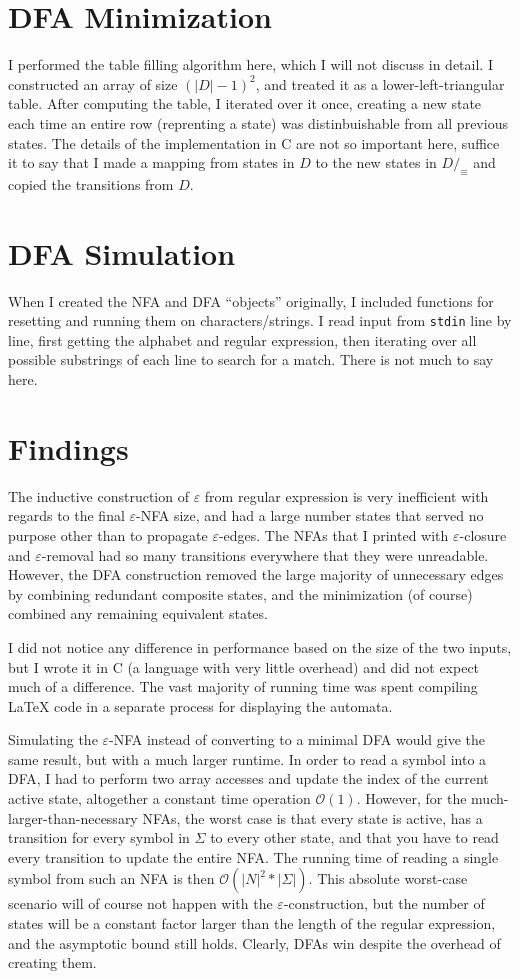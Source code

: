 \documentclass{article}
\begin{document}
\section*{DFA Minimization}
I performed the table filling algorithm here, which I will not discuss in detail. I constructed an array of size $(|D|-1)^2$, and treated it as a lower-left-triangular table. After computing the table, I iterated over it once, creating a new state each time an entire row (reprenting a state) was distinbuishable from all previous states. The details of the implementation in C are not so important here, suffice it to say that I made a mapping from states in $D$ to the new states in $D/_\equiv$ and copied the transitions from $D$.

\section*{DFA Simulation}
When I created the NFA and DFA ``objects'' originally, I included functions for resetting and running them on characters/strings. I read input from \texttt{stdin} line by line, first getting the alphabet and regular expression, then iterating over all possible substrings of each line to search for a match. There is not much to say here.

\section*{Findings}
The inductive construction of $\varepsilon$ from regular expression is very inefficient with regards to the final $\varepsilon$-NFA size, and had a large number states that served no purpose other than to propagate $\varepsilon$-edges. The NFAs that I printed with $\varepsilon$-closure and $\varepsilon$-removal had so many transitions everywhere that they were unreadable. However, the DFA construction removed the large majority of unnecessary edges by combining redundant composite states, and the minimization (of course) combined any remaining equivalent states.

I did not notice any difference in performance based on the size of the two inputs, but I wrote it in C (a language with very little overhead) and did not expect much of a difference. The vast majority of running time was spent compiling \LaTeX{} code in a separate process for displaying the automata.

Simulating the $\varepsilon$-NFA instead of converting to a minimal DFA would give the same result, but with a much larger runtime. In order to read a symbol into a DFA, I had to perform two array accesses and update the index of the current active state, altogether a constant time operation $\mathcal{O}(1)$. However, for the much-larger-than-necessary NFAs, the worst case is that every state is active, has a transition for every symbol in $\Sigma$ to every other state, and that you have to read every transition to update the entire NFA. The running time of reading a single symbol from such an NFA is then $\mathcal{O}(|N|^2*|\Sigma|)$. This absolute worst-case scenario will of course not happen with the $\varepsilon$-construction, but the number of states will be a constant factor larger than the length of the regular expression, and the asymptotic bound still holds. Clearly, DFAs win despite the overhead of creating them.
\end{document}
